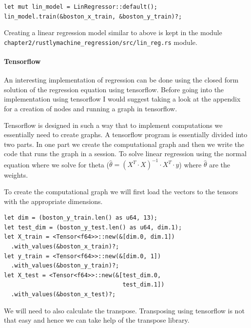 \documentclass{book}
\begin{document}
\begin{lstlisting}[caption={chapter2\\/rustlymachine\_regression\\/src\\/lin\_reg\\.rs}]
let mut lin_model = LinRegressor::default();
lin_model.train(&boston_x_train, &boston_y_train)?;
\end{lstlisting}

Creating a linear regression model similar to above is kept in the module \lstinline{chapter2/rustlymachine_regression/src/lin_reg.rs} module.
\label{par:}
\paragraph{Tensorflow}%
An interesting implementation of regression can be done using the closed form solution of the regression equation using tensorflow. Before going into the implementation using tensorflow I would suggest taking a look at the appendix for a creation of nodes and running a graph in tensorflow.

Tensorflow is designed in such a way that to implement computations we essentially need to create graphs. A tensorflow program is essentially divided into two parts. In one part we create the computational graph and then we write the code that runs the graph in a session. To solve linear regression using the normal equation where we solve for theta ($\hat{\theta} = (X^T \cdot X)^{-1}\cdot X^T \cdot y$) where $\hat{\theta}$ are the weights.

To create the computational graph we will first load the vectors to the tensors with the appropriate dimensions.

\begin{lstlisting}[caption={chapter\\/rust\_and\_tf\\/src\\/linear\_regression\\.rs}]
let dim = (boston_y_train.len() as u64, 13);
let test_dim = (boston_y_test.len() as u64, dim.1);
let X_train = <Tensor<f64>>::new(&[dim.0, dim.1])
  .with_values(&boston_x_train)?;
let y_train = <Tensor<f64>>::new(&[dim.0, 1])
  .with_values(&boston_y_train)?;
let X_test = <Tensor<f64>>::new(&[test_dim.0,
                                  test_dim.1])
  .with_values(&boston_x_test)?;
\end{lstlisting}

We will need to also calculate the transpose. Transposing using tensorflow is not that easy and hence we can take help of the transpose library.
\end{document}

